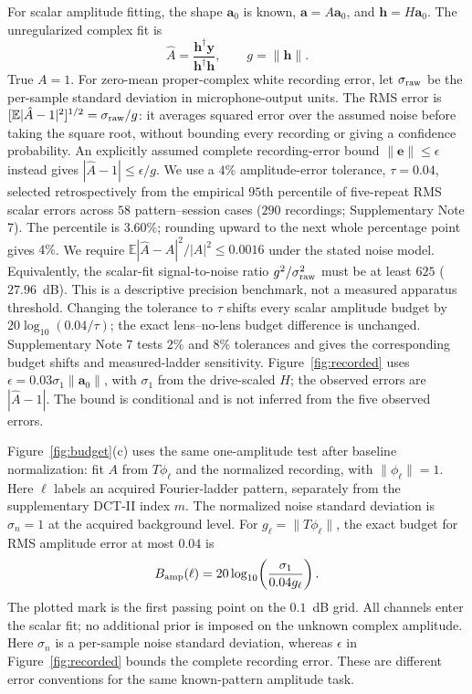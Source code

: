 \documentclass[lineno,pdflatex,sn-nature]{sn-jnl}%
\theoremstyle{thmstyleone}%
\theoremstyle{thmstyletwo}%
\theoremstyle{thmstylethree}%
\begin{document}
For scalar amplitude fitting, the shape $\mathbf a_0$ is known, $\mathbf a=A\mathbf a_0$, and $\mathbf h=H\mathbf a_0$. The unregularized complex fit is
\begin{equation}
 \hat A=\frac{\mathbf h^\dagger\mathbf y}{\mathbf h^\dagger\mathbf h},\qquad g=\|\mathbf h\|.
\end{equation}
True $A=1$. For zero-mean proper-complex white recording error, let $\sigma_{\rm raw}$ be the per-sample standard deviation in microphone-output units. The RMS error is $[\mathbb E|\hat A-1|^2]^{1/2}=\sigma_{\rm raw}/g$: it averages squared error over the assumed noise before taking the square root, without bounding every recording or giving a confidence probability. An explicitly assumed complete recording-error bound $\|\mathbf e\|\leq\epsilon$ instead gives $|\hat A-1|\leq\epsilon/g$. We use a $4\%$ amplitude-error tolerance, $\tau=0.04$, selected retrospectively from the empirical $95$th percentile of five-repeat RMS scalar errors across $58$ pattern--session cases ($290$ recordings; Supplementary Note 7). The percentile is $3.60\%$; rounding upward to the next whole percentage point gives $4\%$. We require $\mathbb E|\hat A-A|^2/|A|^2\le0.0016$ under the stated noise model. Equivalently, the scalar-fit signal-to-noise ratio $g^2/\sigma_{\rm raw}^2$ must be at least $625$ ($27.96$~dB). This is a descriptive precision benchmark, not a measured apparatus threshold. Changing the tolerance to $\tau$ shifts every scalar amplitude budget by $20\log_{10}(0.04/\tau)$; the exact lens--no-lens budget difference is unchanged. Supplementary Note 7 tests $2\%$ and $8\%$ tolerances and gives the corresponding budget shifts and measured-ladder sensitivity. Figure~\ref{fig:recorded} uses $\epsilon=0.03\sigma_1\|\mathbf a_0\|$, with $\sigma_1$ from the drive-scaled $H$; the observed errors are $|\hat A-1|$. The bound is conditional and is not inferred from the five observed errors.


Figure~\ref{fig:budget}(c) uses the same one-amplitude test after baseline normalization: fit $A$ from $T\phi_\ell$ and the normalized recording, with $\|\phi_\ell\|=1$. Here $\ell$ labels an acquired Fourier-ladder pattern, separately from the supplementary DCT-II index $m$. The normalized noise standard deviation is $\sigma_n=1$ at the acquired background level. For $g_\ell=\|T\phi_\ell\|$, the exact budget for RMS amplitude error at most $0.04$ is
\begin{equation}
 B_{\rm amp}(\ell)=20\log_{10}\!\left(\frac{\sigma_1}{0.04g_\ell}\right).
\end{equation}
The plotted mark is the first passing point on the $0.1$~dB grid. All channels enter the scalar fit; no additional prior is imposed on the unknown complex amplitude. Here $\sigma_n$ is a per-sample noise standard deviation, whereas $\epsilon$ in Figure~\ref{fig:recorded} bounds the complete recording error. These are different error conventions for the same known-pattern amplitude task.
\end{document}
